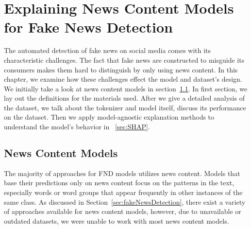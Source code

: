 
\chapter{Explaining News Content Models for Fake News Detection}\label{chapter:explainingNewsContentModels}
The automated detection of fake news on social media comes with its characteristic challenges. The fact
that fake news are constructed to misguide its consumers makes them hard to distinguish by only using news content.
In this chapter, we examine how these challenges effect the model and dataset's design. We initially take a look at news content models in section~\ref{sec:newsContentModels}. In first section, we lay out the definitions for the materials used. After we give a detailed analysis of the dataset, we talk about the tokenizer and model itself, discuss its performance on the dataset. Then we apply model-agnostic explanation methods to understand the model's behavior in ~\ref{sec:SHAP}.

\section{News Content Models}
\label{sec:newsContentModels}
The majority of approaches for FND models utilizes news content. Models that base their predictions only on news content focus on the patterns in the text, especially words or word groups that appear frequently in other instances of the same class. As discussed in Section~\ref{sec:fakeNewsDetection}, there exist a variety of approaches available for news content models, however, due to unavailable or outdated datasets, we were unable to work with most news content models.


